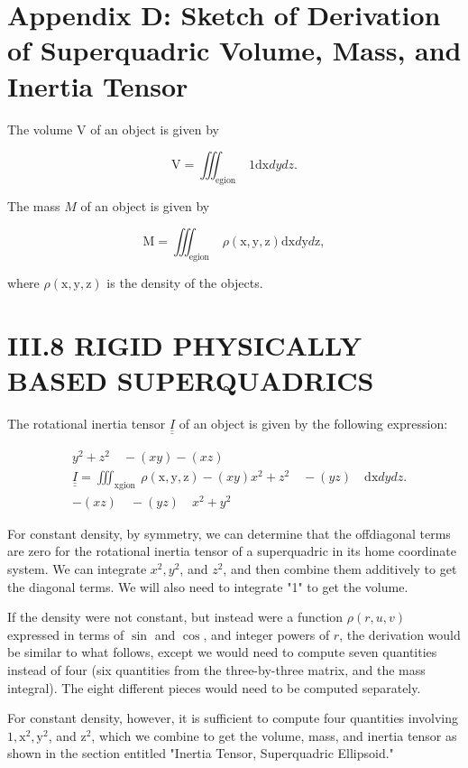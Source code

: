 \section{Appendix D: Sketch of Derivation of Superquadric Volume, Mass, and Inertia Tensor}
The volume $\mathrm{V}$ of an object is given by

$$
\mathrm{V}=\iiint_{\text {egion }} 1 \mathrm{dx} d y d z .
$$

The mass $M$ of an object is given by

$$
\mathrm{M}=\iiint_{\text {egion }} \rho(\mathrm{x}, \mathrm{y}, \mathrm{z}) \mathrm{dx} d \mathrm{y} d \mathrm{z},
$$

where $\rho(\mathrm{x}, \mathrm{y}, \mathrm{z})$ is the density of the objects.

\section{III.8 RIGID PHYSICALLY BASED SUPERQUADRICS}
The rotational inertia tensor $\underline{\underline{I}}$ of an object is given by the following expression:

$$
\begin{aligned}
& y^{2}+z^{2} \quad-(x y)-(x z) \\
& \underline{\underline{I}}=\iiint_{\text {xgion }} \rho(\mathrm{x}, \mathrm{y}, \mathrm{z})-(x y) x^{2}+z^{2} \quad-(y z) \quad \mathrm{dx} d y d z . \\
& -(x z) \quad-(y z) \quad x^{2}+y^{2}
\end{aligned}
$$

For constant density, by symmetry, we can determine that the offdiagonal terms are zero for the rotational inertia tensor of a superquadric in its home coordinate system. We can integrate $x^{2}, y^{2}$, and $z^{2}$, and then combine them additively to get the diagonal terms. We will also need to integrate "1" to get the volume.

If the density were not constant, but instead were a function $\rho(r, u, v)$ expressed in terms of $\sin$ and $\cos$, and integer powers of $r$, the derivation would be similar to what follows, except we would need to compute seven quantities instead of four (six quantities from the three-by-three matrix, and the mass integral). The eight different pieces would need to be computed separately.

For constant density, however, it is sufficient to compute four quantities involving $1, \mathrm{x}^{2}, \mathrm{y}^{2}$, and $\mathrm{z}^{2}$, which we combine to get the volume, mass, and inertia tensor as shown in the section entitled "Inertia Tensor, Superquadric Ellipsoid."

